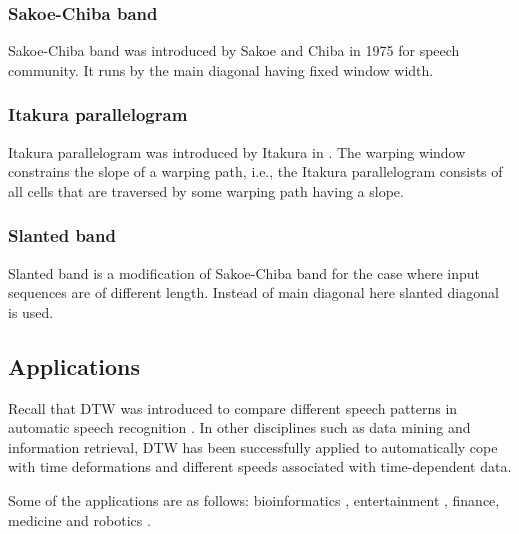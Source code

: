 \documentclass{article}
\begin{document}
	\subsubsection*{Sakoe-Chiba band}
	Sakoe-Chiba band was introduced by Sakoe and Chiba in 1975 \cite{Sakoe:1990:DPA:108235.108244} for speech community.
	It runs by the main diagonal having fixed window width.
	\subsubsection*{Itakura parallelogram}	
	Itakura parallelogram was introduced by Itakura in \cite{Itakura}.
	The warping window constrains the slope of a
	warping path, i.e., the Itakura parallelogram
	consists of all cells that are traversed by some warping path having a slope. 
	\subsubsection*{Slanted band}	
	Slanted band is a modification of Sakoe-Chiba band for the case where input sequences are of different length. Instead of main diagonal here slanted diagonal is used.
	
		\subsection*{Applications}
	Recall that DTW was introduced to compare different
	speech patterns in automatic speech recognition \cite{Sakoe:1990:DPA:108235.108244}. In other disciplines such as
	data mining and information retrieval, DTW has been successfully applied
	to automatically cope with time deformations and different speeds associated with time-dependent data. 
	
	 Some of the applications are as follows: bioinformatics \cite{journals/bioinformatics/AachC01}, entertainment \cite{Zhu:2003:WIE:872757.872780}, finance, medicine \cite{medicine} and robotics \cite{robtics}.
	
 

\end{document}
